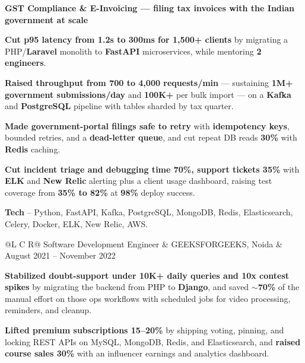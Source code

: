 \textcolor{Project}{\textbf{GST Compliance \& E-Invoicing --- filing tax invoices with the Indian government at scale}}
\vspace{-0.6ex}
\begin{zitemize}
    \item \textbf{Cut p95 latency from 1.2s to 300ms for 1,500+ clients} by migrating a PHP/\textbf{Laravel} monolith to \textbf{FastAPI} microservices, while mentoring \textbf{2 engineers}.
    \item \textbf{Raised throughput from 700 to 4,000 requests/min} --- sustaining \textbf{1M+ government submissions/day} and \textbf{100K+} per bulk import --- on a \textbf{Kafka} and \textbf{PostgreSQL} pipeline with tables sharded by tax quarter.
    \item \textbf{Made government-portal filings safe to retry} with \textbf{idempotency keys}, bounded retries, and a \textbf{dead-letter queue}, and cut repeat DB reads \textbf{30\%} with \textbf{Redis} caching.
    \item \textbf{Cut incident triage and debugging time 70\%, support tickets 35\%} with \textbf{ELK} and \textbf{New Relic} alerting plus a client usage dashboard, raising test coverage from \textbf{35\% to 82\%} at \textbf{98\%} deploy success.
    \item \textbf{Tech} -- Python, FastAPI, Kafka, PostgreSQL, MongoDB, Redis, Elasticsearch, Celery, Docker, ELK, New Relic, AWS.
\end{zitemize}

\vspace{0.6ex}
\noindent
\begin{tabularx}{\textwidth}{@{}L C R@{}}
\textcolor{role}{Software Development Engineer} & \textcolor{company}{GEEKSFORGEEKS, Noida} & \textcolor{date}{August 2021 -- November 2022}\\
\end{tabularx}
\vspace{-2.4ex}
\begin{zitemize}
    \item \textbf{Stabilized doubt-support under 10K+ daily queries and 10x contest spikes} by migrating the backend from PHP to \textbf{Django}, and saved $\sim$\textbf{70\%} of the manual effort on those ops workflows with scheduled jobs for video processing, reminders, and cleanup.
    \item \textbf{Lifted premium subscriptions 15--20\%} by shipping voting, pinning, and locking REST APIs on MySQL, MongoDB, Redis, and Elasticsearch, and \textbf{raised course sales 30\%} with an influencer earnings and analytics dashboard.
\end{zitemize}
